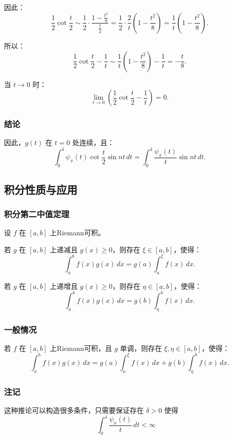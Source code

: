 \documentclass[12pt]{article}
\begin{document}
因此：
\[
\frac{1}{2} \cot \frac{t}{2} \sim \frac{1}{2} \cdot \frac{1 - \frac{t^2}{8}}{\frac{t}{2}} = \frac{1}{2} \cdot \frac{2}{t} \left( 1 - \frac{t^2}{8} \right) = \frac{1}{t} \left( 1 - \frac{t^2}{8} \right).
\]

所以：
\[
\frac{1}{2} \cot \frac{t}{2} - \frac{1}{t} \sim \frac{1}{t} \left( 1 - \frac{t^2}{8} \right) - \frac{1}{t} = -\frac{t}{8}.
\]

当 \( t \to 0 \) 时：
\[
\lim_{t \to 0} \left( \frac{1}{2} \cot \frac{t}{2} - \frac{1}{t} \right) = 0.
\]

\subsubsection{结论}

因此，\( g(t) \) 在 \( t = 0 \) 处连续，且：
\[
\int_0^\delta \psi_x(t) \cot \frac{t}{2} \sin nt \, dt = \int_0^\delta \frac{\psi_x(t)}{t} \sin nt \, dt.
\]
	
	\subsection{积分性质与应用}
	
	
	
	\subsubsection{积分第二中值定理}
	设 \( f \) 在 \([a, b]\) 上Riemann可积。
	
	若 \( g \) 在 \([a, b]\) 上递减且 \( g(x) \geq 0 \)，则存在 \(\xi \in [a, b]\)，使得：
		\[
		\int_a^b f(x) g(x) \, dx = g(a) \int_a^\xi f(x) \, dx.
		\]
  
  若 \( g \) 在 \([a, b]\) 上递增且 \( g(x) \geq 0 \)，则存在 \(\eta \in [a, b]\)，使得：
		\[
		\int_a^b f(x) g(x) \, dx = g(b) \int_\eta^b f(x) \, dx.
		\]

	
	\subsubsection{一般情况}
	
	若 \( f \) 在 \([a, b]\) 上Riemann可积，且 \( g \) 单调，则存在 \(\xi, \eta \in [a, b]\)，使得：
	\[
	\int_a^b f(x) g(x) \, dx = g(a) \int_a^\xi f(x) \, dx + g(b) \int_\eta^b f(x) \, dx.
	\]
	
	\subsubsection{注记}
	这种推论可以构造很多条件，只需要保证存在 $\delta > 0$ 使得
\[
\int_{0}^{\delta} \frac{\psi_x(t)}{t} \, dt < \infty \quad 
\]
\end{document}
